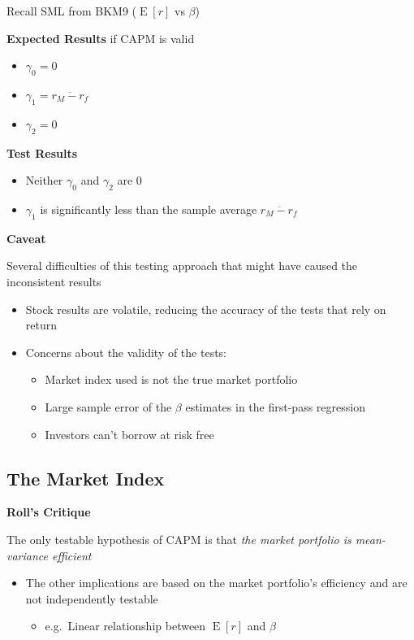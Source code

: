 \documentclass[]{book}
\providecommand{\tightlist}{%
  \setlength{\itemsep}{0pt}\setlength{\parskip}{0pt}}
\theoremstyle{definition}
\theoremstyle{definition}
\theoremstyle{remark}
\begin{document}
Recall SML from BKM9 (\(\operatorname{E}[r]\) vs \(\beta\))

\textbf{Expected Results} if CAPM is valid

\begin{itemize}
\item
  \(\gamma_0 = 0\)
\item
  \(\gamma_1 = \overline{r_M - r_f}\)
\item
  \(\gamma_2 = 0\)
\end{itemize}

\textbf{Test Results}

\begin{itemize}
\item
  Neither \(\gamma_0\) and \(\gamma_2\) are 0
\item
  \(\gamma_1\) is significantly less than the sample average
  \(\overline{r_M - r_f}\)
\end{itemize}

 \textbf{Caveat}

Several difficulties of this testing approach that might have caused the
inconsistent results

\begin{itemize}
\tightlist
\item
  Stock results are volatile, reducing the accuracy of the tests that
  rely on return
\item
  Concerns about the validity of the tests:

  \begin{itemize}
  \tightlist
  \item
    Market index used is not the true market portfolio
  \item
    Large sample error of the \(\beta\) estimates in the first-pass
    regression
  \item
    Investors can't borrow at risk free
  \end{itemize}
\end{itemize}

\subsection{The Market Index}\label{the-market-index}

\textbf{Roll's Critique}

The only testable hypothesis of CAPM is that \emph{the market portfolio
is mean-variance efficient}

\begin{itemize}
\item
  The other implications are based on the market portfolio's efficiency
  and are not independently testable

  \begin{itemize}
  \tightlist
  \item
    e.g.~Linear relationship between \(\operatorname{E}[r]\) and
    \(\beta\)
  \end{itemize}
\end{itemize}
\end{document}
